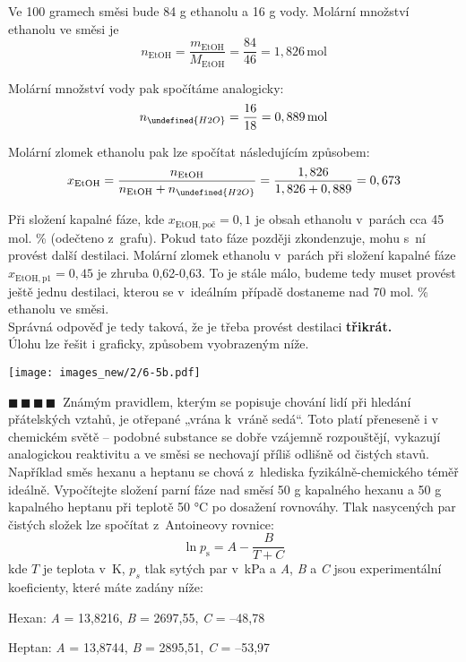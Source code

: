 \documentclass{book}
\let\ch\undefined
\newcommand{\ctyri}{$\blacksquare \, \blacksquare \, \blacksquare \, \blacksquare \; \; $}
\renewenvironment{quotation}{\par}{\par} %
\begin{document}
Ve 100 gramech směsi bude 84 g ethanolu a 16 g vody. Molární množství
ethanolu ve směsi je 
\[
n_\mathrm{{EtOH}}=\frac{m_\mathrm{{EtOH}}}{M_\mathrm{{EtOH}}}=\frac{84}{46}=1,826\,\mathrm{mol}
\]

Molární množství vody pak spočítáme analogicky:
\[
n_{\ch{H2O}}=\frac{16}{18}=0,889\,\mathrm{mol}
\]

Molární zlomek ethanolu pak lze spočítat následujícím způsobem:
\[
x_\mathrm{{EtOH}}=\frac{n_\mathrm{{EtOH}}}{n_\mathrm{{EtOH}}+n_{\ch{H2O}}}=\frac{1,826}{1,826+0,889}=0,673
\]

Při složení kapalné fáze, kde $x_{\mathrm{EtOH,poč}}=0,1$ je obsah
ethanolu v~parách cca 45 mol. \% (odečteno z~grafu). Pokud tato fáze
později zkondenzuje, mohu s~ní provést další destilaci. Molární zlomek
ethanolu v\ parách při složení kapalné fáze $x_{\mathrm{EtOH,p1}}=0,45$ je
zhruba 0,62-0,63. To je stále málo, budeme tedy muset provést ještě
jednu destilaci, kterou se v~ideálním případě dostaneme nad 70 mol.
\% ethanolu ve směsi.\\
Správná odpověď je tedy taková, že je třeba provést destilaci \textbf{třikrát.}\\
Úlohu lze řešit i graficky, způsobem vyobrazeným níže.

\begin{center}
\texttt{[image: images\_new/2/6-5b.pdf]}
\end{center}


\hrulefill %
\begin{quotation}
\ctyri Známým pravidlem, kterým se popisuje chování lidí při hledání přátelských
vztahů, je otřepané „vrána k~vráně sedá“. Toto platí přeneseně i v
chemickém světě -- podobné substance se dobře vzájemně rozpouštějí,
vykazují analogickou reaktivitu a ve směsi se nechovají příliš odlišně
od čistých stavů. Například směs hexanu a heptanu se chová z~hlediska
fyzikálně-chemického téměř ideálně. Vypočítejte složení parní fáze
nad směsí 50 g kapalného hexanu a 50 g kapalného heptanu při teplotě
50 °C po dosažení rovnováhy. Tlak nasycených par čistých složek lze
spočítat z~Antoineovy rovnice: 
\[
\ln p_{\mathrm{s}}=A-\frac{B}{T+C}
\]
kde $T$ je teplota v~K, $p_{s}$ tlak sytých par v~kPa a \textit{A}, \textit{B} a \textit{C} jsou experimentální koeficienty, které máte zadány níže: 

Hexan: \textit{A} = 13,8216, \textit{B} = 2697,55, \textit{C} = --48,78 

Heptan: \textit{A} = 13,8744, \textit{B} = 2895,51, \textit{C} = --53,97
\end{quotation} \dotfill \par 
\end{document}
